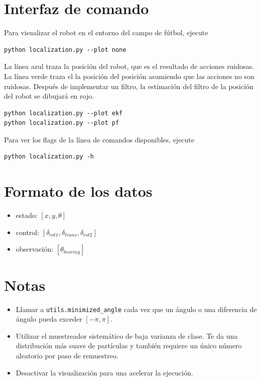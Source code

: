 \documentclass[tp]{lcc}
\begin{document}
	\section{Interfaz de comando}

	Para visualizar el robot en el entorno del campo de fútbol, ejecute

\begin{lstlisting}[style=bash] 
python localization.py --plot none
\end{lstlisting}


	La línea azul traza la posición del robot, que es el resultado de acciones ruidosas. La línea verde traza el la posición del posición asumiendo que las acciones no son ruidosas. Después de implementar un filtro, la estimación del filtro de la posición del robot se dibujará en rojo.
	
	
\begin{lstlisting}[style=bash] 
python localization.py --plot ekf
python localization.py --plot pf
\end{lstlisting}

	Para ver los flags de la línea de comandos disponibles, ejecute

\begin{lstlisting}[style=bash] 
python localization.py -h
\end{lstlisting}

	\section{Formato de los datos}

	\begin{itemize}
		\item estado: $[x,y,\theta]$
		\item control: $[\delta_{rot1},\delta_{trans},\delta_{rot2}]$
		\item observación: $[\theta_{bearing}]$
	\end{itemize}
	
	\section{Notas}
	\begin{itemize}
		\item Llamar a \lstinline[style=bash]{utils.minimized_angle} cada vez que un ángulo o una diferencia de ángulo pueda exceder $[-\pi, \pi]$.
		\item Utilizar el muestreador sistemático de baja varianza de clase. Te da una distribución más suave de partículas y también requiere un único número aleatorio por paso de remuestreo.
		\item Desactivar la visualización para una acelerar la ejecución.
	\end{itemize}
\end{document}
